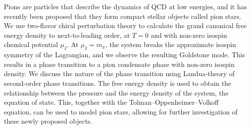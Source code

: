 Pions are particles that describe the dynamics of QCD at low energies, and it has recently been proposed that they form compact stellar objects called pion stars.
We use two-flavor chiral perturbation theory to calculate the grand canonical free energy density to next-to-leading order, at $T = 0$ and with non-zero isospin chemical potential $\mu_I$.
At $\mu_I = m_\pi$, the system breaks the approximate isospin symmetry of the Lagrangian, and we observe the resulting Goldstone mode.
This results in a phase transition to a pion condensate phase with non-zero isospin density.
We discuss the nature of the phase transition using Landua-theory of second-order phase transitions.
The free energy density is used to obtain the relationship between the pressure and the energy density of the system, the equation of state.
This, together with the Tolman–Oppenheimer–Volkoff equation, can be used to model pion stars, allowing for further investigation of these newly proposed objects.
